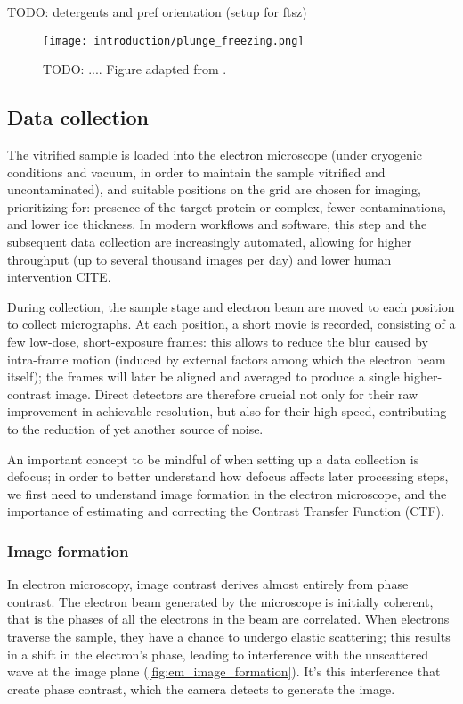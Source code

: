 TODO: detergents and pref orientation (setup for ftsz)

\begin{figure}[ht]
    \centering
    \texttt{[image: introduction/plunge\_freezing.png]}
    \caption[Vitrification via plunge freezing]{TODO: .... Figure adapted from \citet{chungNobelPrizeChemistry2017}.}
    \label{fig:em_plunge_freezing}
\end{figure}

\subsection{Data collection}
The vitrified sample is loaded into the electron microscope (under cryogenic conditions and vacuum, in order to maintain the sample vitrified and uncontaminated), and suitable positions on the grid are chosen for imaging, prioritizing for: presence of the target protein or complex, fewer contaminations, and lower ice thickness.
In modern workflows and software, this step and the subsequent data collection are increasingly automated, allowing for higher throughput (up to several thousand images per day) and lower human intervention CITE.

During collection, the sample stage and electron beam are moved to each position to collect micrographs.
At each position, a short movie is recorded, consisting of a few low-dose, short-exposure frames: this allows to reduce the blur caused by intra-frame motion (induced by external factors among which the electron beam itself); the frames will later be aligned and averaged to produce a single higher-contrast image.
Direct detectors are therefore crucial not only for their raw improvement in achievable resolution, but also for their high speed, contributing to the reduction of yet another source of noise.

An important concept to be mindful of when setting up a data collection is defocus; in order to better understand how defocus affects later processing steps, we first need to understand image formation in the electron microscope, and the importance of estimating and correcting the Contrast Transfer Function (CTF).

\subsubsection{Image formation}

In electron microscopy, image contrast derives almost entirely from phase contrast.
The electron beam generated by the microscope is initially coherent, that is the phases of all the electrons in the beam are correlated.
When electrons traverse the sample, they have a chance to undergo elastic scattering; this results in a shift in the electron's phase, leading to interference with the unscattered wave at the image plane (\autoref{fig:em_image_formation}).
It's this interference that create phase contrast, which the camera detects to generate the image.

